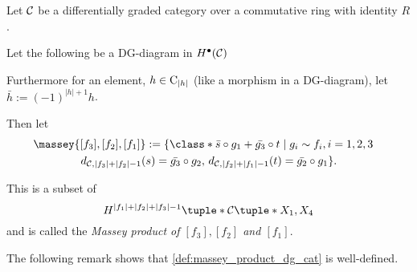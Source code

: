 \begin{definition}
    \label{def:massey_product_dg_cat}
    Let \( {\mathcal{C}} \) be a differentially graded category over a commutative ring with identity \( R \).

    Let the following be a DG-diagram in \( H^\bullet({\mathcal{C}}) \)
    \begin{center}
    \end{center}

    Furthermore for an element, \( h \in \operatorname{C}_{|h|} \) (like a morphism in a DG-diagram), let \( \bar{h} := (-1)^{|h| + 1}h \).

    Then let
    \begin{multline*}
        \massey{[f_3], [f_2], [f_1]} :=
        \{
            \class*{
                \bar{s} \circ g_1 + \bar{g_3} \circ t
            }
            \mid g_i \sim f_i, i = 1, 2, 3 \quad \\
            d_{\Cc, |f_3| + |f_2| - 1}(s) = \bar{g_3} \circ g_2, \,
            d_{\Cc, |f_2| + |f_1| - 1}(t) = \bar{g_2} \circ g_1
        \}.
    \end{multline*}

    This is a subset of
    \[
        H^{|f_1| + |f_2| + |f_3| - 1}\tuple*{\Cc}\tuple*{X_1, X_4}
    \]
    and is called the \emph{Massey product of \( [f_3], [f_2] \) and \( [f_1] \)}.
\end{definition}

The following remark shows that \autoref{def:massey_product_dg_cat} is well-defined.

